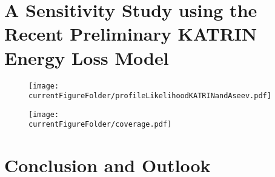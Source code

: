 \section{A Sensitivity Study using the Recent Preliminary KATRIN Energy Loss Model}
\label{sec:katrinElossModelResults}
\def\currentRootFolder{chapter/sensitivityStudyWithPreliminaryKatrinElossModel}
\def\currentFigureFolder{\currentRootFolder/fig}
\begin{figure}[th]
	\centering
	\texttt{[image: \\currentFigureFolder/profileLikelihoodKATRINandAseev.pdf]}
	\xcaption{}{}{}
	\label{fig:katrinElossResultsProfileLikelihood}
\end{figure}

\begin{figure}[th]
	\centering
	\texttt{[image: \\currentFigureFolder/coverage.pdf]}
	\label{fig:katrinElossResultsCoverage}
\end{figure}


\section{Conclusion and Outlook}
\label{sec:katrinElossModelConclusion}